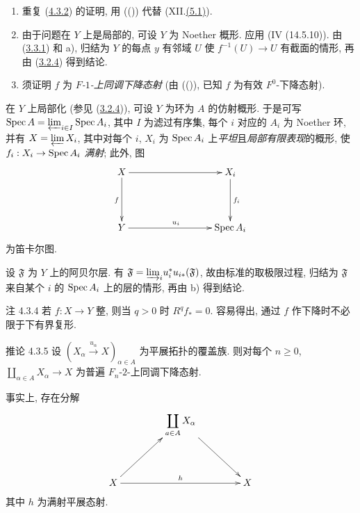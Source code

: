 \begin{enumerate}
\renewcommand{\theenumi}{\alph {enumi}}
\renewcommand{\labelenumi}{\theenumi)}
\item 重复 (\hyperref[Vbis.prop4.3.2]{4.3.2}) 的证明,
用 (()) 代替 (XII.\hyperref[XII.thm5.1]{(5.1)}).

\item 由于问题在 $Y$ 上是局部的, 可设 $Y$ 为 Noether 概形.
应用 (\EGA IV (14.5.10)). 由 (\hyperref[Vbis.prop3.3.1]{3.3.1}) 和 a),
归结为 $Y$ 的每点 $y$ 有邻域 $U$ 使 $f^{-1}(U)\to U$ 有截面的情形,
再由 (\hyperref[Vbis.prop3.2.4]{3.2.4}) 得到结论.

\item 须证明 $f$ 为 \emph{$F$-$1$-上同调下降态射}
(由 (()), 已知 $f$ 为有效 $F^0$-下降态射).
\end{enumerate}

在 $Y$ 上局部化 (参见 (\hyperref[Vbis.prop3.2.4]{3.2.4})),
可设 $Y$ 为环为 $A$ 的仿射概形.
于是可写 $\operatorname{Spec} A=\varprojlim_{i\in I}\operatorname{Spec} A_i$,
其中 $I$ 为滤过有序集, 每个 $i$ 对应的 $A_i$ 为 Noether 环,
并有 $X=\varprojlim X_i$, 其中对每个 $i$,
$X_i$ 为 $\operatorname{Spec} A_i$ 上\emph{平坦}且\emph{局部有限表现}的概形,
使 $f_i:X_i\to\Spec A_i$ \emph{满射}; 此外, 图
\[
\xymatrix@C=3cm@R=1.5cm{
X \ar[r]\ar[d]_{f}& X_i \ar[d]^{f_i}\\
Y \ar[r]^{u_i}& \Spec A_i
}
\]
为\pageoriginale{}笛卡尔图.

设 $\mathfrak{F}$ 为 $Y$ 上的阿贝尔层.
有 $\mathfrak{F}={\varinjlim}_i u^{\ast}_i u_{i\ast}(\mathfrak{F})$,
故由标准的取极限过程, 归结为 $\mathfrak{F}$ 来自某个 $i$ 的
$\operatorname{Spec} A_i$ 上的层的情形, 再由 b) 得到结论.

\begin{enonce*}[remark]{注 4.3.4}
若 $f:X\to Y$ 整, 则当 $q>0$ 时 $R^qf_{\ast}=0$.
容易得出, 通过 $f$ 作下降时不必限于下有界复形.
\end{enonce*}

\begin{enonce*}{推论 4.3.5}
设 $(X_{\alpha}\xrightarrow{u_\alpha}X)_{\alpha\in A}$ 为平展拓扑的覆盖族.
则对每个 $n\geq0$, $\coprod_{\alpha\in A}X_{\alpha}\to X$
为普遍 $F_n$-$2$-上同调下降态射.
\end{enonce*}

事实上, 存在分解
\[
\xymatrix@=1.5cm{
  &\displaystyle{\mathop{\coprod}_{a\in A} X_{\alpha}} \ar[rd]&\\
X \ar[ru]         \ar[rr]^{h} &                              & X
}
\]
其中 $h$ 为满射平展态射.



